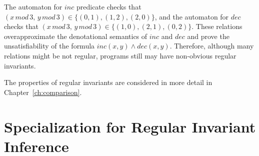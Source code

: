 \begin{example}
The automaton for $inc$ predicate checks that $ (x \, \mathit{mod} \, 3, \, y \, \mathit{mod} \, 3) \in \{(0,1), (1 , 2 ), (2,0) \} $, and the automaton for $ dec $ checks that $ (x \, \mathit{mod} \, 3, \, y \, \mathit{mod} \, 3) \in \{(1,0),(2,1),(0,2)\}$. These relations overapproximate the denotational semantics of $inc$ and $dec$ and prove the unsatisfiability of the formula $inc(x, y) \land dec(x, y)$.
Therefore, although many relations might be not regular, programs still may have non-obvious regular invariants.
\end{example}

The properties of regular invariants are considered in more detail in Chapter~\cref{ch:comparison}.

\section{Specialization for Regular Invariant Inference}\label{sec:fmf/specRegular}

\newworkflowWithTestersAndSelectors{}

